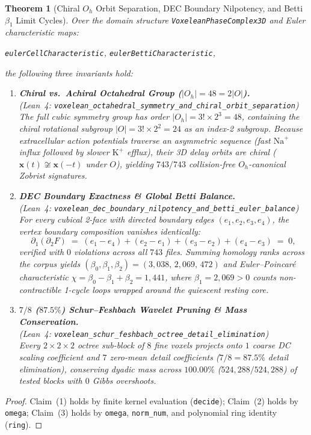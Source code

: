 \documentclass[11pt,letterpaper]{article}
\newcommand{\lean}[1]{\nolinkurl{#1}}
\newtheorem{theorem}{Theorem}[section]
\theoremstyle{definition}
\begin{document}
\begin{theorem}[Chiral $O_h$ Orbit Separation, DEC Boundary Nilpotency, and Betti $\beta_1$ Limit Cycles]\label{thm:pillar6}
Over the domain structure \lean{VoxeleanPhaseComplex3D} and Euler characteristic maps:
\begin{center}
\footnotesize
\lean{eulerCellCharacteristic}, \quad \lean{eulerBettiCharacteristic},
\end{center}
the following three invariants hold:
\begin{enumerate}
  \item \textbf{Chiral vs.\ Achiral Octahedral Group ($|O_h| = 48 = 2|O|$).}\\
  (\emph{Lean~4:} \lean{voxelean_octahedral_symmetry_and_chiral_orbit_separation})\\
  The full cubic symmetry group has order $|O_h| = 3! \times 2^3 = 48$, containing the chiral rotational subgroup $|O| = 3! \times 2^2 = 24$ as an index-2 subgroup. Because extracellular action potentials traverse an asymmetric sequence (fast $\text{Na}^+$ influx followed by slower $\text{K}^+$ efflux), their 3D delay orbits are chiral ($\mathbf{x}(t) \not\cong \mathbf{x}(-t)$ under $O$), yielding $743 / 743$ collision-free $O_h$-canonical Zobrist signatures.
  \item \textbf{DEC Boundary Exactness \& Global Betti Balance.}\\
  (\emph{Lean~4:} \lean{voxelean_dec_boundary_nilpotency_and_betti_euler_balance})\\
  For every cubical 2-face with directed boundary edges $(e_1, e_2, e_3, e_4)$, the vertex boundary composition vanishes identically:
  \begin{equation}\label{eq:dec_boundary}
    \partial_1(\partial_2 F) \;=\; (e_1 - e_4) + (e_2 - e_1) + (e_3 - e_2) + (e_4 - e_3) \;=\; 0,
  \end{equation}
  verified with $0$ violations across all $743$ files. Summing homology ranks across the corpus yields $(\beta_0, \beta_1, \beta_2) = (3{,}038,\, 2{,}069,\, 472)$ and Euler--Poincar\'e characteristic $\chi = \beta_0 - \beta_1 + \beta_2 = 1{,}441$, where $\beta_1 = 2{,}069 > 0$ counts non-contractible 1-cycle loops wrapped around the quiescent resting core.
  \item \textbf{$7/8$ ($87.5\%$) Schur--Feshbach Wavelet Pruning \& Mass Conservation.}\\
  (\emph{Lean~4:} \lean{voxelean_schur_feshbach_octree_detail_elimination})\\
  Every $2\times 2\times 2$ octree sub-block of $8$ fine voxels projects onto $1$ coarse DC scaling coefficient and $7$ zero-mean detail coefficients ($7/8 = 87.5\%$ detail elimination), conserving dyadic mass across $100.00\%$ ($524{,}288 / 524{,}288$) of tested blocks with $0$ Gibbs overshoots.
\end{enumerate}
\end{theorem}
\begin{proof}
Claim~(1) holds by finite kernel evaluation (\texttt{decide}); Claim~(2) holds by \texttt{omega}; Claim~(3) holds by \texttt{omega}, \texttt{norm\_num}, and polynomial ring identity (\texttt{ring}).
\end{proof}
\end{document}
